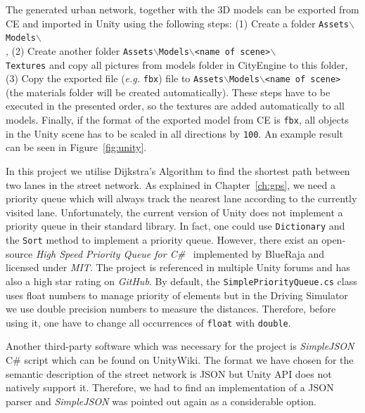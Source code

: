 The generated urban network, together with the 3D models can be exported from CE and imported in Unity using the following steps: (1) Create a folder \texttt{Assets$\backslash$Models$\backslash$\\<name of scene>}, (2) Create another folder \texttt{Assets$\backslash$Models$\backslash$<name of scene>$\backslash$\\Textures} and copy all pictures from models folder in CityEngine to this folder, (3) Copy the exported file (\emph{e.g.} \texttt{fbx}) file to \texttt{Assets$\backslash$Models$\backslash$<name of scene>} (the materials folder will be created automatically). These steps have to be executed in the presented order, so the textures are added automatically to all models. Finally, if the format of the exported model from CE is \texttt{fbx}, all objects in the Unity scene has to be scaled in all directions by \texttt{100}. An example result can be seen in Figure~\ref{fig:unity}.

In this project we utilise Dijkstra's Algorithm to find the shortest path between two lanes in the street network. As explained in Chapter~\ref{ch:gps}, we need a priority queue which will always track the nearest lane according to the currently visited lane. Unfortunately, the current version of Unity does not implement a priority queue in their standard library. In fact, one could use \texttt{Dictionary} and the \texttt{Sort} method to implement a priority queue. However, there exist an open-source \emph{High Speed Priority Queue for C\#}~\cite{pq} implemented by BlueRaja and licensed under \emph{MIT}. The project is referenced in multiple Unity forums and has also a high star rating on \emph{GitHub}. By default, the \texttt{SimplePriorityQueue.cs} class uses float numbers to manage priority of elements but in the Driving Simulator we use double precision numbers to measure the distances. Therefore, before using it, one have to change all occurrences of \texttt{float} with \texttt{double}.

Another third-party software which was necessary for the project is \emph{SimpleJSON} C\# script which can be found on UnityWiki. The format we have chosen for the semantic description of the street network is JSON but Unity API does not natively support it. Therefore, we had to find an implementation of a JSON parser and \emph{SimpleJSON} was pointed out again as a considerable option.
